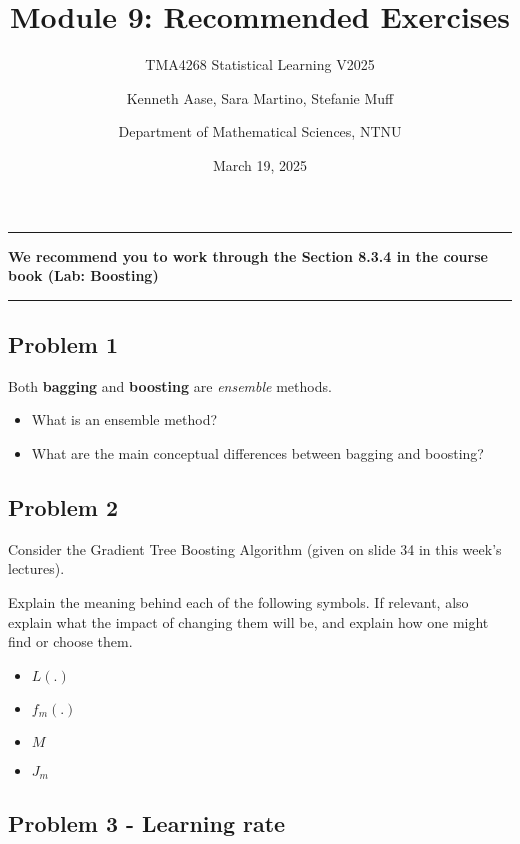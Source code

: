 \documentclass[
]{article}
\title{Module 9: Recommended Exercises}
\subtitle{TMA4268 Statistical Learning V2025}
\author{Kenneth Aase, Sara Martino, Stefanie Muff \and Department of
Mathematical Sciences, NTNU}
\date{March 19, 2025}
\providecommand{\tightlist}{%
  \setlength{\itemsep}{0pt}\setlength{\parskip}{0pt}}
\begin{document}
\maketitle

\begin{center}\rule{0.5\linewidth}{0.5pt}\end{center}

\textbf{We recommend you to work through the Section 8.3.4 in the course
book (Lab: Boosting)}

\begin{center}\rule{0.5\linewidth}{0.5pt}\end{center}

\subsection{Problem 1}\label{problem-1}

Both \textbf{bagging} and \textbf{boosting} are \emph{ensemble} methods.

\begin{itemize}
\tightlist
\item
  What is an ensemble method?
\item
  What are the main conceptual differences between bagging and boosting?
\end{itemize}

\subsection{Problem 2}\label{problem-2}

Consider the Gradient Tree Boosting Algorithm (given on slide 34 in this
week's lectures).

Explain the meaning behind each of the following symbols. If relevant,
also explain what the impact of changing them will be, and explain how
one might find or choose them.

\begin{itemize}
\tightlist
\item
  \(L(.)\)
\item
  \(f_m(.)\)
\item
  \(M\)
\item
  \(J_m\)
\end{itemize}

\subsection{Problem 3 - Learning rate}\label{problem-3---learning-rate}
\end{document}
